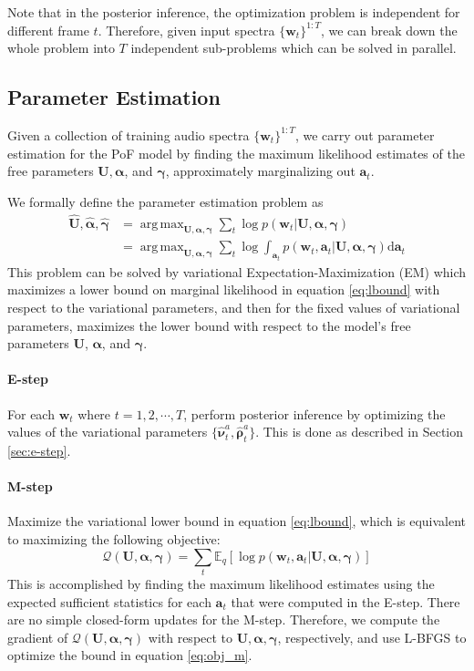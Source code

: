 \documentclass{article} %
\DeclareMathOperator*{\argmax}{arg\,max}
\begin{document}
Note that in the posterior inference, the optimization problem is independent for different frame $t$. Therefore, given input spectra $\{\bm{w}_t\}^{1:T}$, we can break down the whole problem into $T$ independent sub-problems which can be solved in parallel. 

\subsection{Parameter Estimation}

Given a collection of training audio spectra $\{\bm{w}_t\}^{1:T}$, we carry out parameter estimation for the PoF model by finding the maximum likelihood estimates of the free parameters $\mathbf{U}, \bm{\alpha}$, and $\bm{\gamma}$, approximately marginalizing out $\bm{a}_t$.

We formally define the parameter estimation problem as
\begin{align} \label{eq:obj}
\hat{\mathbf{U}}, \hat{\bm{\alpha}}, \hat{\bm{\gamma}} &= \argmax_{\mathbf{U}, \bm{\alpha}, \bm{\gamma}} \sum_t \log p(\bm{w}_t | \mathbf{U}, \bm{\alpha}, \bm{\gamma}) \\ 
&= \argmax_{\mathbf{U}, \bm{\alpha}, \bm{\gamma}} \sum_t \log \int_{\bm{a}_t} p(\bm{w}_t, \bm{a}_t | \mathbf{U}, \bm{\alpha}, \bm{\gamma}) \mathrm{d} \bm{a}_t \nonumber
\end{align}
This problem can be solved by variational Expectation-Maximization (EM) which maximizes a lower bound on marginal likelihood in equation \ref{eq:lbound} with respect to the variational parameters, and then for the fixed values of variational parameters, maximizes the lower bound with respect to the model's free parameters $\mathbf{U}$, $\bm{\alpha}$, and $\bm{\gamma}$. 

\paragraph{E-step} For each $\bm{w}_t$ where $t = 1, 2, \cdots, T$, perform posterior inference by optimizing the values of the variational parameters $\{\hat{\bm{\nu}}_t^{a}, \hat{\bm{\rho}}_t^{a}\}$. This is done as described in Section \ref{sec:e-step}.

\paragraph{M-step}
Maximize the variational lower bound in equation \ref{eq:lbound}, which is equivalent to maximizing the following objective: 
\begin{equation} \label{eq:obj_m}
\mathcal{Q}(\mathbf{U}, \bm{\alpha}, \bm{\gamma}) = \textstyle{\sum_t} \mathbb{E}_q [ \log p(\bm{w}_t, \bm{a}_t | \mathbf{U}, \bm{\alpha}, \bm{\gamma}) ] 
\end{equation}
This is accomplished by finding the maximum likelihood estimates using
the expected sufficient statistics for each $\bm{a}_t$ that were
computed in the E-step. There are no simple closed-form updates for the
M-step. Therefore, we compute the gradient of $\mathcal{Q}(\mathbf{U},
\bm{\alpha}, \bm{\gamma})$ with respect to $\mathbf{U}, \bm{\alpha},
\bm{\gamma}$, respectively, and use L-BFGS to optimize the bound in
equation \ref{eq:obj_m}.
\end{document}
